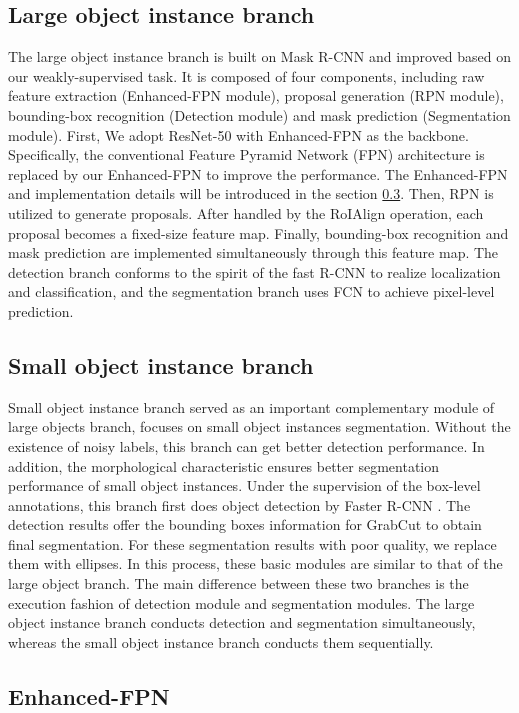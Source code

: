 \documentclass{article}
\begin{document}
\subsection{Large object instance branch}
The large object instance branch is built on Mask R-CNN and improved based on our weakly-supervised task. It is composed of four components, including raw feature extraction (Enhanced-FPN module), proposal generation (RPN  module), bounding-box recognition (Detection module) and mask prediction (Segmentation module).
First, We adopt ResNet-50 with Enhanced-FPN as the backbone.
Specifically, the conventional Feature Pyramid Network (FPN) \cite{FPN} architecture is replaced by our Enhanced-FPN to improve the performance.
The Enhanced-FPN  and implementation details will be introduced in the section \ref{sec:Enhance_FPN}.
Then, RPN \cite{RPN} is utilized to generate proposals.
After handled by the RoIAlign \cite{maskrcnn} operation, each proposal becomes a fixed-size feature map.
Finally, bounding-box recognition and mask prediction are implemented simultaneously through this feature map.
The detection branch conforms to the spirit of the fast R-CNN \cite{fastrcnn} to realize localization and classification, and the segmentation branch uses FCN \cite{FCN} to achieve pixel-level prediction.

\subsection{Small object instance branch}
Small object instance branch served as an important complementary module of large objects branch, focuses on small object instances segmentation.
Without the existence of noisy labels, this branch can get better detection performance.
In addition, the morphological characteristic ensures better segmentation performance of small object instances.
Under the supervision of the box-level annotations, this branch first does object detection by Faster R-CNN \cite{RPN}.
The detection results offer the bounding boxes information for GrabCut to obtain final segmentation. For these segmentation results with poor quality, we replace them with ellipses.
In this process, these basic modules are similar to that of the large object branch.
The main difference between these two branches is the execution fashion of detection module and segmentation modules.
The large object instance branch conducts detection and segmentation simultaneously, whereas the small object instance branch conducts them sequentially.

\subsection{Enhanced-FPN}
\label{sec:Enhance_FPN}
\end{document}
